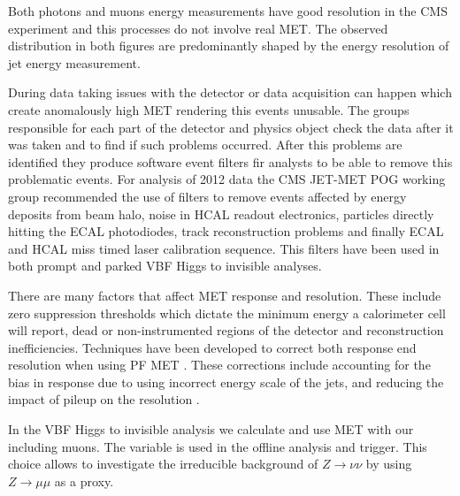Both photons and muons energy measurements have good resolution in the \gls{CMS} experiment and this processes do not involve real \gls{MET}. The observed distribution in both figures are predominantly shaped by the energy resolution of jet energy measurement.

During data taking issues with the detector or data acquisition can happen which create anomalously high \gls{MET} rendering this events unusable. The groups responsible for each part of the detector and physics object check the data after it was taken and to find if such problems occurred. After this problems are identified they produce software event filters fir analysts to be able to remove this problematic events. For analysis of 2012 data the \gls{CMS} JET-MET \gls{POG} working group recommended the use of filters to remove events affected by energy deposits from beam halo, noise in \gls{HCAL} readout electronics, particles directly hitting the \gls{ECAL} photodiodes, track reconstruction problems and finally \gls{ECAL} and \gls{HCAL} miss timed laser calibration sequence. This filters have been used in both prompt and parked \gls{VBF} Higgs to invisible analyses.

There are many factors that affect \gls{MET} response and resolution. These include zero suppression thresholds which dictate the minimum energy a calorimeter cell will report, dead or non-instrumented regions of the detector and reconstruction inefficiencies. Techniques have been developed to correct both response end resolution when using \gls{PF} \gls{MET} \cite{ARTICLE:CMSMissingTransverseEnergyPerformance}. These corrections include accounting for the bias in response due to using incorrect energy scale of the jets, and reducing the impact of pileup on the resolution \cite{ARTICLE:CMSMETPerformance8TeV}.

In the \gls{VBF} Higgs to invisible analysis we calculate and use \gls{MET} with our including muons. The variable is used in the offline analysis and trigger. This choice allows to investigate the irreducible background of $Z \rightarrow \nu\nu$ by using $Z \rightarrow \mu\mu$ as a proxy.

